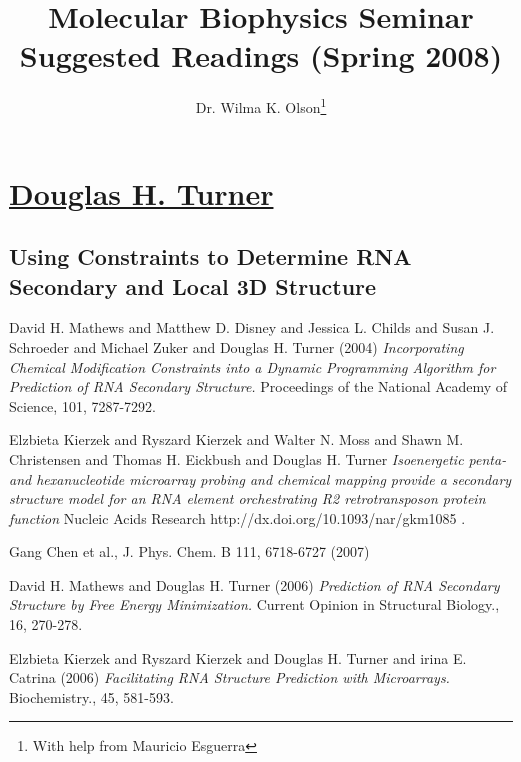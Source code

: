 \title{Molecular Biophysics Seminar Suggested Readings (Spring 2008)}
\author{Dr. Wilma K. Olson\thanks{With help from Mauricio Esguerra}}
\maketitle

\label{readings} 


\section*{\underline{Douglas H. Turner}}
\subsection*{Using Constraints to Determine RNA Secondary and Local 3D Structure}

\begin{thebibliography}{1}
 David H. Mathews and Matthew D. Disney and
Jessica L. Childs and Susan J. Schroeder and Michael Zuker and
Douglas H. Turner (2004) {\em Incorporating Chemical Modification Constraints into
a Dynamic Programming Algorithm for Prediction
of RNA Secondary Structure.} Proceedings of the National Academy of
Science, 101, 7287-7292.

Elzbieta Kierzek and Ryszard Kierzek and Walter N. Moss and 
Shawn M. Christensen and Thomas H. Eickbush and Douglas H. Turner {\em
Isoenergetic penta- and hexanucleotide microarray probing and
chemical mapping provide a secondary structure model for an RNA
element orchestrating R2 retrotransposon protein function} Nucleic
Acids Research http://dx.doi.org/10.1093/nar/gkm1085  .

Gang Chen et al., J. Phys. Chem. B 111, 6718-6727 (2007)








 David H. Mathews and Douglas H. Turner (2006) 
{\em
    Prediction of RNA Secondary Structure by Free Energy
    Minimization.} Current Opinion in Structural Biology., 16, 270-278.

 Elzbieta Kierzek and Ryszard Kierzek and Douglas
  H. Turner and irina E. Catrina (2006) {\em Facilitating RNA
    Structure Prediction with Microarrays.} Biochemistry., 45, 581-593.
\end{thebibliography}

\newpage

